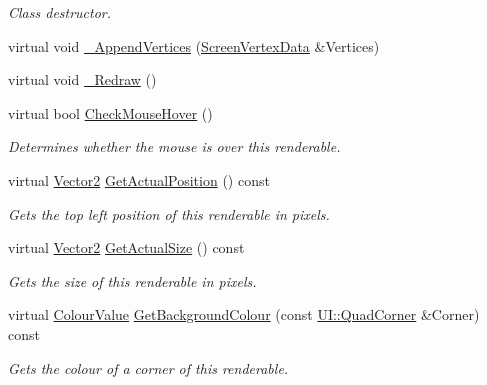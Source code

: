\begin{DoxyCompactItemize}
\begin{DoxyCompactList}\small\item\em Class destructor. \item\end{DoxyCompactList}\item 
virtual void \hyperlink{classMezzanine_1_1UI_1_1Rectangle_a63c0d8868a46039cffc03151eb546604}{\_\-AppendVertices} (\hyperlink{classMezzanine_1_1UI_1_1ScreenVertexData}{ScreenVertexData} \&Vertices)
\item 
virtual void \hyperlink{classMezzanine_1_1UI_1_1Rectangle_ac9753a163a9f0e0cae1d7840472e9923}{\_\-Redraw} ()
\item 
virtual bool \hyperlink{classMezzanine_1_1UI_1_1Rectangle_ad4d0f9a0e2a445acea1ef0a2d1edfc09}{CheckMouseHover} ()
\begin{DoxyCompactList}\small\item\em Determines whether the mouse is over this renderable. \item\end{DoxyCompactList}\item 
virtual \hyperlink{classMezzanine_1_1Vector2}{Vector2} \hyperlink{classMezzanine_1_1UI_1_1Rectangle_a642bbe279ac7c4473f8449e58f61ac31}{GetActualPosition} () const 
\begin{DoxyCompactList}\small\item\em Gets the top left position of this renderable in pixels. \item\end{DoxyCompactList}\item 
virtual \hyperlink{classMezzanine_1_1Vector2}{Vector2} \hyperlink{classMezzanine_1_1UI_1_1Rectangle_a172e2725569b4d5c234349fe5b797d2b}{GetActualSize} () const 
\begin{DoxyCompactList}\small\item\em Gets the size of this renderable in pixels. \item\end{DoxyCompactList}\item 
virtual \hyperlink{classMezzanine_1_1ColourValue}{ColourValue} \hyperlink{classMezzanine_1_1UI_1_1Rectangle_ab83257db4897765e4c097826a8df58bd}{GetBackgroundColour} (const \hyperlink{namespaceMezzanine_1_1UI_a61a42a62e4838bc93b194886a363fe36}{UI::QuadCorner} \&Corner) const 
\begin{DoxyCompactList}\small\item\em Gets the colour of a corner of this renderable. \item\end{DoxyCompactList}\item 

\end{DoxyCompactItemize}

